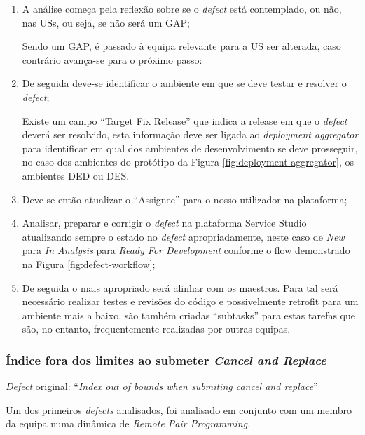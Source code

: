             \begin{enumerate}
                \item A análise começa pela reflexão sobre se o \textit{defect} está contemplado, ou não, nas USs, ou seja, se não será um GAP;
                
                Sendo um GAP, é passado à equipa relevante para a US ser alterada, caso contrário avança-se para o próximo passo: 
                \item De seguida deve-se identificar o ambiente em que se deve testar e resolver o \textit{defect};
                
                Existe um campo ``Target Fix Release'' que indica a release em que o \textit{defect} deverá ser resolvido, esta informação deve ser ligada ao \textit{deployment aggregator} para identificar em qual dos ambientes de desenvolvimento se deve prosseguir, no caso dos ambientes do protótipo da Figura \ref{fig:deployment-aggregator}, os ambientes DED ou DES.  
                \item Deve-se então atualizar o ``Assignee'' para o nosso utilizador na plataforma;
                \item Analisar, preparar e corrigir o \textit{defect} na plataforma Service Studio atualizando sempre o estado no \textit{defect} apropriadamente, neste caso de \textit{New} para \textit{In Analysis} para \textit{Ready For Development} conforme o flow demonstrado na Figura \ref{fig:defect-workflow};
                \item De seguida o mais apropriado será alinhar com os maestros. Para tal será necessário realizar testes e revisões do código e possivelmente retrofit para um ambiente mais a baixo, são também criadas ``subtasks'' para estas tarefas que são, no entanto,  frequentemente realizadas por outras equipas. 
            \end{enumerate}

        \subsubsection{Índice fora dos limites ao submeter \textit{Cancel and Replace}}\label{index_out_of_bounds_defect}

        \textit{Defect} original: ``\textit{Index out of bounds when submiting cancel and replace}''


            Um dos primeiros \textit{defects} analisados, foi analisado em conjunto com um membro da equipa numa dinâmica de \textit{Remote Pair Programming}.


